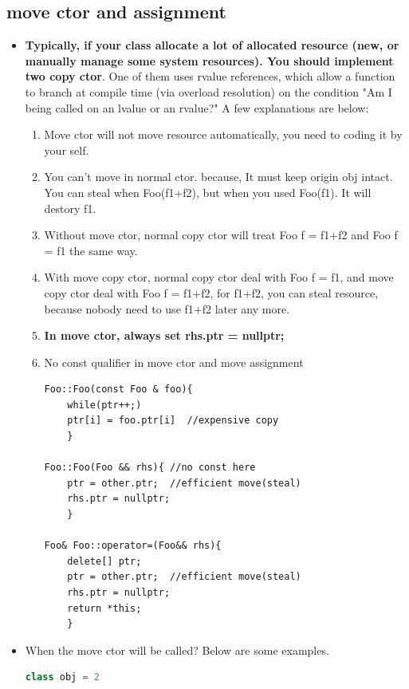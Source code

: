 \documentclass[a4paper,11pt,twoside]{book}
\begin{document}
\subsection{move ctor and assignment}
\begin{itemize}
	\item \textbf{Typically, if your class allocate a lot of allocated resource (new, or manually manage some system resources).  You should implement two copy ctor}. One of them uses rvalue references, which allow a function to branch at compile time (via overload resolution) on the condition "Am I being called on an lvalue or an rvalue?" A few explanations are below:
	
	\begin{enumerate}
		\item Move ctor will not move resource automatically, you need to coding it by your self.
		
		\item You can't move in normal ctor. because, It must keep origin obj intact.  You can steal when Foo(f1+f2), but when you used Foo(f1).  It will destory f1.
		
		\item Without  move ctor, normal copy ctor will treat Foo f = f1+f2 and Foo f = f1 the same way.
		
		\item With move copy ctor, normal copy ctor deal with Foo f = f1, and move copy ctor deal with Foo f = f1+f2, for f1+f2, you can steal resource, because nobody need to use f1+f2 later any more.
		
		\item \textbf{In move ctor, always set rhs.ptr = nullptr;}
		
		\item No const qualifier in move ctor and move assignment
\begin{lstlisting}[numbers=none]
Foo::Foo(const Foo & foo){
	while(ptr++;)
	ptr[i] = foo.ptr[i]  //expensive copy
	}
		
Foo::Foo(Foo && rhs){ //no const here
	ptr = other.ptr;  //efficient move(steal)
	rhs.ptr = nullptr;
	}
		
Foo& Foo::operator=(Foo&& rhs){
	delete[] ptr;
	ptr = other.ptr;  //efficient move(steal)
	rhs.ptr = nullptr;
	return *this;
	}
\end{lstlisting}
		
	\end{enumerate}
	
\item When the move ctor will be called? Below are some examples.
\begin{lstlisting}[frame=single, language=c++]
class obj = 2 
	

\end{lstlisting}
\end{itemize}
\end{document}

